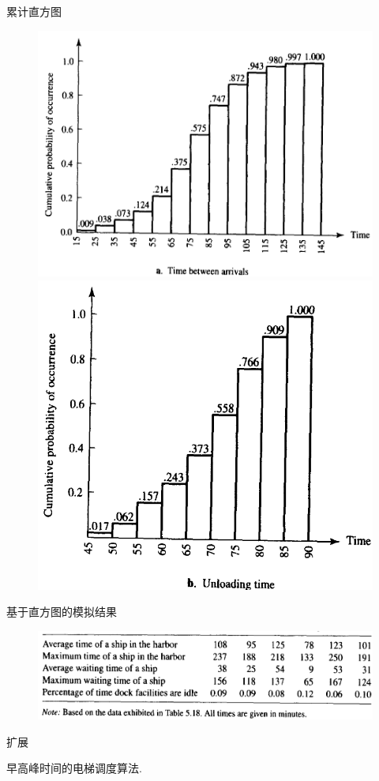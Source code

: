 \documentclass[UTF8]{ctexbeamer}
\begin{document}
\begin{frame}{累计直方图}

  \begin{figure}
    \centering
    \includegraphics[height=.5\textheight{}]{harbor-arrive.png}
    \includegraphics[height=.5\textheight{}]{harbor-unload.png}
  \end{figure}
  
\end{frame}

\begin{frame}{基于直方图的模拟结果}
  \begin{figure}
    \centering
    \includegraphics[width=.8\textwidth{}]{harbor-sim-real.png}
  \end{figure}
  
\end{frame}

\begin{frame}{扩展}

早高峰时间的电梯调度算法.
  
\end{frame}
\end{document}
